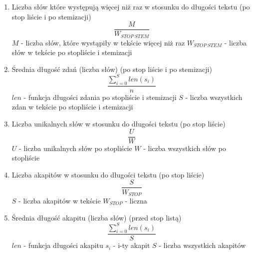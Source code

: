 \documentclass{classrep}
\begin{document}
\begin{enumerate}
  \item Liczba słów które występują więcej niż raz w stosunku do długości tekstu (po stop liście i po stemizacji)
  \newline 
  \begin{equation}
  	\frac{M}{W_{STOP\ STEM}}
  \end{equation}
  \newline \quad $M$ - liczba słów, które wystąpiły w tekście więcej niż raz
  \newline \quad $W_{STOP\ STEM}$ - liczba słów w tekście po stopliście i stemizacji
  
  \item Średnia długość zdań (liczba słów) (po stop liście i  po stemizacji)
  \newline
  \begin{equation}
  	\frac{\sum_{i=0}^S len(s_i)}{n}
  \end{equation}
  \newline \quad $len$ - funkcja długości zdania po stopliście i stemizacji
  \newline \quad $S$ - liczba wszystkich zdan w tekście po stopliście i stemizacji
  
  \item Liczba unikalnych słów w stosunku do długości tekstu (po stop liście)
  \newline
  \begin{equation}
  	\frac{U}{W}
  \end{equation}
  \newline \quad $U$ - liczba unikalnych słów po stopliście
  \newline \quad $W$ - liczba wszystkich słów po stopliście
  
  \item Liczba akapitów w stosunku do długości tekstu (po stop liście)
  \newline
  \begin{equation}
  	\frac{S}{W_{STOP}}
  \end{equation}
  \newline \quad $S$ - liczba akapitów w tekście
  \newline \quad $W_{STOP}$ - liczna 
  
  \item Średnia długość akapitu (liczba słów) (przed stop listą)
  \newline
  \begin{equation}
  	\frac{\sum_{i=0}^S len(s_i)}{S}
  \end{equation}
  \newline \quad $len$ - funkcja długości akapitu
  \newline \quad $s_i$ - i-ty akapit
  \newline \quad $S$ - liczba wszystkich akapitów
  

\end{enumerate}
\end{document}
